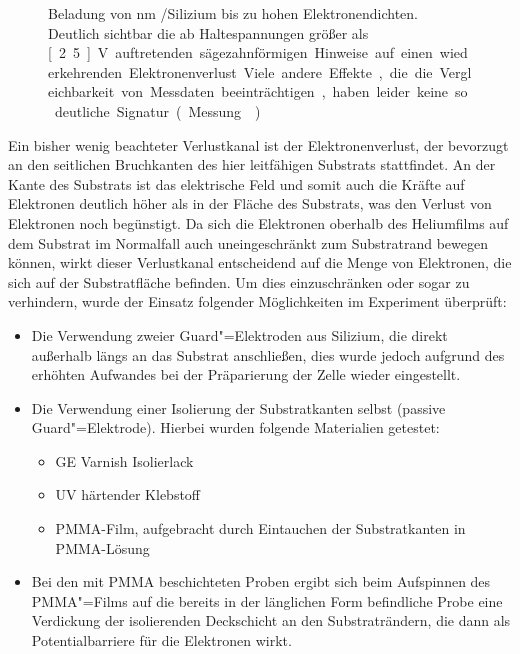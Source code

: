 \begin{figure}[h!tb]
    \hfill%
    \begin{minipage}[b]{\textwidth-\midwidth-\tabcolsep}
        \caption[hohe Elektronendichten auf \SiO\ mit sichtbarem Elektronenverlust]{Beladung von \unit[200]{nm} \SiO /Silizium bis zu hohen Elektronendichten. Deutlich sichtbar die ab Haltespannungen größer als \unit[2.5]{V} auftretenden sägezahnförmigen Hinweise auf einen wiederkehrenden Elektronenverlust. Viele andere Effekte, die die Vergleichbarkeit von Messdaten beeinträchtigen, haben leider keine so deutliche Signatur. (Messung )}
        \label{fig:e_sawtooth}
    \end{minipage}
\end{figure}

Ein bisher wenig beachteter Verlustkanal ist der Elektronenverlust, der bevorzugt an den seitlichen Bruchkanten des hier leitfähigen Substrats stattfindet. An der Kante des Substrats ist das elektrische Feld und somit auch die Kräfte auf Elektronen deutlich höher als in der Fläche des Substrats, was den Verlust von Elektronen noch begünstigt. Da sich die Elektronen oberhalb des Heliumfilms auf dem Substrat im Normalfall auch uneingeschränkt zum Substratrand bewegen können, wirkt dieser Verlustkanal entscheidend auf die Menge von Elektronen, die sich auf der Substratfläche befinden. Um dies einzuschränken oder sogar zu verhindern, wurde der Einsatz folgender Möglichkeiten im Experiment überprüft:
\begin{itemize}
    \item Die Verwendung zweier Guard"=Elektroden aus Silizium, die direkt außerhalb längs an das Substrat anschließen, dies wurde jedoch aufgrund des erhöhten Aufwandes bei der Präparierung der Zelle wieder eingestellt.
    \item Die Verwendung einer Isolierung der Substratkanten selbst (passive Guard"=Elektrode). Hierbei wurden folgende Materialien getestet:
    \begin{itemize}
        \item GE Varnish Isolierlack
        \item UV härtender Klebstoff
        \item PMMA-Film, aufgebracht durch Eintauchen der Substratkanten in PMMA-Lösung
    \end{itemize}
    \item Bei den mit PMMA beschichteten Proben ergibt sich beim Aufspinnen des PMMA"=Films auf die bereits in der länglichen Form befindliche Probe eine Verdickung der isolierenden Deckschicht an den Substraträndern, die dann als Potentialbarriere für die Elektronen wirkt. 
\end{itemize}

